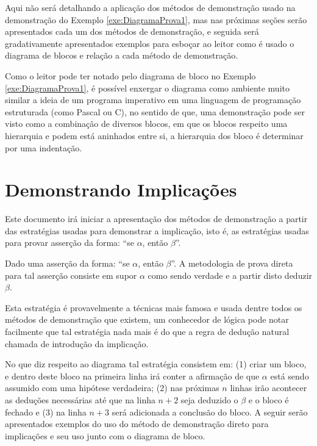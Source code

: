 Aqui não será detalhando a aplicação dos métodos de demonstração usado na demonstração do Exemplo \ref{exe:DiagramaProva1}, mas nas próximas seções serão apresentados cada um dos métodos de demonstração, e seguida será gradativamente apresentados exemplos para esboçar ao leitor como é usado o diagrama de blocos e relação a cada método de demonstração.

Como o leitor pode ter notado pelo diagrama de bloco no Exemplo \ref{exe:DiagramaProva1}, é possível enxergar o diagrama como ambiente muito similar a ideia de um programa imperativo em uma linguagem de programação estruturada (como Pascal ou C), no sentido de que, uma demonstração pode ser visto como a combinação de diversos blocos, em que os blocos respeito uma hierarquia e podem está aninhados entre si, a hierarquia dos bloco é determinar por uma indentação.

\section{Demonstrando Implicações}\label{sec:DemonstrandoImplicacoes}

Este documento irá iniciar a apresentação dos métodos de demonstração a partir das estratégias usadas para demonstrar a implicação, isto é, as estratégias usadas para provar asserção da forma: ``se $\alpha$, então $\beta$''.

\begin{definicao}
	Dado uma asserção da forma: ``se $\alpha$, então $\beta$''. A metodologia de prova direta para tal asserção consiste em supor $\alpha$ como sendo verdade e a partir disto deduzir $\beta$.
\end{definicao}

Esta estratégia é provavelmente a técnicas mais famosa e usada dentre todos os métodos de demonstração que existem, um conhecedor de lógica pode notar facilmente que tal estratégia nada mais é do que a regra de dedução natural chamada de introdução da implicação\cite{joaoPavao2014}.

No que diz respeito ao diagrama tal estratégia consistem em: (1) criar um bloco, e dentro deste bloco na primeira linha irá conter a afirmação de que $\alpha$ está sendo assumido com uma hipótese verdadeira; (2) nas próximas $n$ linhas irão acontecer as deduções necessárias até que na linha $n+2$ seja deduzido o $\beta$ e o bloco é fechado e (3) na linha $n + 3$ será adicionada a conclusão do bloco. A seguir serão apresentados exemplos do uso do método de demonstração direto para implicações e seu uso junto com o diagrama de bloco.

